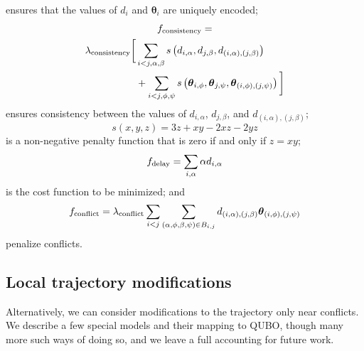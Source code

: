 ensures that the values of $d_i$ and $\boldsymbol \theta_i$ are uniquely encoded;
\begin{multline}
f_{\mathrm{consistency}}
=\\
\begin{split}
\lambda_{\mathrm{consistency}}
\bigg[
&\sum_{i < j,\alpha, \beta} 
s\left(d_{i,\alpha}, d_{j, \beta}, d_{(i, \alpha), (j, \beta)}\right)
\\
&+
\sum_{i < j,\phi, \psi} 
s\left(\boldsymbol \theta_{i,\phi}, \boldsymbol \theta_{j, \psi}, \boldsymbol \theta_{(i, \phi), (j, \psi)}\right)
\bigg]
\end{split}
\end{multline}
ensures consistency between the values of $d_{i,\alpha}$, $d_{j, \beta}$, and $d_{(i, \alpha), (j, \beta)}$;
\begin{equation}
s(x, y, z) = 3z + xy - 2xz - 2 yz
\end{equation}
is a non-negative penalty function that is zero if and only if $z = xy$;
\begin{equation}
f_{\mathrm{delay}}
= \sum_{i, \alpha} \alpha d_{i, \alpha}
\end{equation}
is the cost function to be minimized; and
\begin{equation}
  f_{\mathrm{conflict}}
=
\lambda_{\mathrm{conflict}}
\sum_{i < j} 
\sum_{(\alpha, \phi, \beta, \psi) \in B_{i, j}} 
d_{(i, \alpha), (j, \beta)} \boldsymbol \theta_{(i, \phi), (j, \psi)}
\end{equation}
penalize conflicts.

\subsection{Local trajectory modifications}

Alternatively, we can consider modifications to the trajectory only near conflicts.
We describe a few special models and their mapping to QUBO,
though many more such ways of doing so, and we leave a full accounting for future work.

